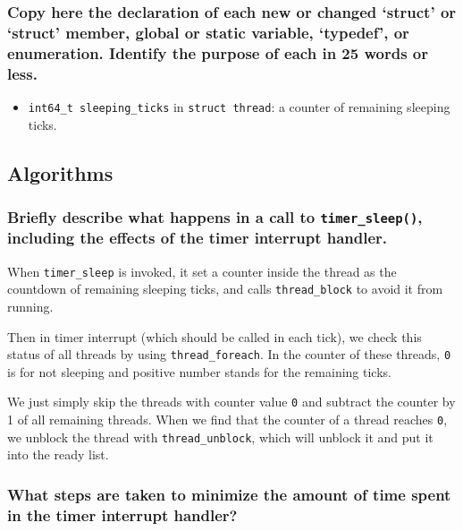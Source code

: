 \documentclass[sigconf, nonacm]{acmart}
\begin{document}
            \subsubsection{Copy here the declaration of each new or changed `struct' or `struct' member, global or static variable, `typedef', or enumeration.  Identify the purpose of each in 25 words or less. } 
            
                \begin{itemize}
                    \item \texttt{int64\_t sleeping\_ticks} in \texttt{struct thread}: a counter of remaining sleeping ticks. 
                \end{itemize}
        
        \subsection{Algorithms}
        
            \subsubsection{Briefly describe what happens in a call to \texttt{timer\_sleep()}, including the effects of the timer interrupt handler. }
                When \texttt{timer\_sleep} is invoked, it set a counter inside the thread as the countdown of remaining sleeping ticks, and calls \texttt{thread\_block} to avoid it from running. 
            
                Then in timer interrupt (which should be called in each tick), we check this status of all threads by using \texttt{thread\_foreach}. In the counter of these threads, \texttt{0} is for not sleeping and positive number stands for the remaining ticks.
            
                We just simply skip the threads with counter value \texttt{0} and subtract the counter by 1 of all remaining threads. When we find that the counter of a thread reaches \texttt{0}, we unblock the thread with \texttt{thread\_unblock}, which will unblock it and put it into the ready list. 
            
            \subsubsection{What steps are taken to minimize the amount of time spent in the timer interrupt handler? }
                
        
\end{document}
